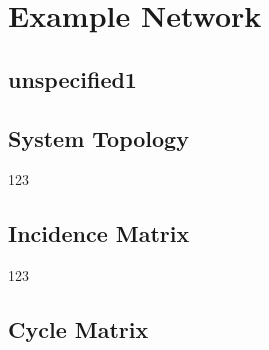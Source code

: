 \chapter{Example Network}
\label{system_description}

\section{unspecified1}
\label{unspecified1}
%


\pagebreak


\section{System Topology}
\label{systemdiagram}

123

\section{Incidence Matrix}
\label{IncidenceSection}

123

\section{Cycle Matrix}
\label{CycleAppendix}
\vspace{4mm}






